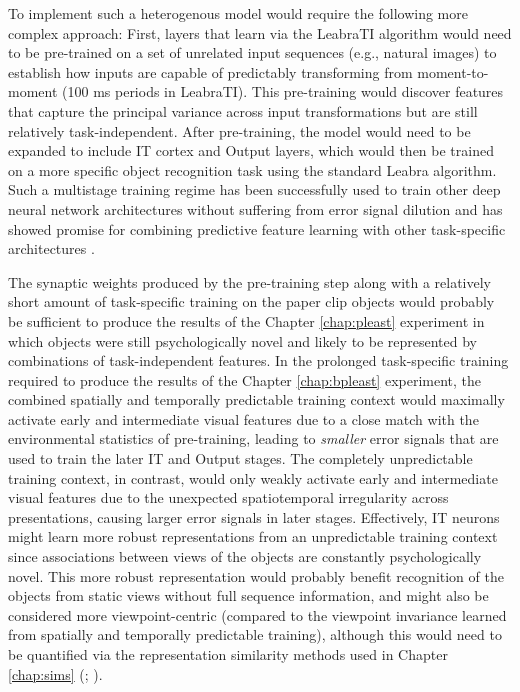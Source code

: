 \documentclass[dwyatte_dissertation.tex]{subfiles}
\begin{document}
To implement such a heterogenous model would require the following more complex approach: First, layers that learn via the LeabraTI algorithm would need to be pre-trained on a set of unrelated input sequences (e.g., natural images) to establish how inputs are capable of predictably transforming from moment-to-moment (100 ms periods in LeabraTI). This pre-training would discover features that capture the principal variance across input transformations but are still relatively task-independent. After pre-training, the model would need to be expanded to include IT cortex and Output layers, which would then be trained on a more specific object recognition task using the standard Leabra algorithm.  %
Such a multistage training regime has been successfully used to train other deep neural network architectures without suffering from error signal dilution \cite{HintonSalakhutdinov06} and has showed promise for combining predictive feature learning with other task-specific architectures  \cite{OReillyWyatteRohrlichEtAlInPrep}.

The synaptic weights produced by the pre-training step along with a relatively short amount of task-specific training on the paper clip objects would probably be sufficient to produce the results of the Chapter \ref{chap:pleast} experiment in which objects were still psychologically novel and likely to be represented by combinations of task-independent features. In the prolonged task-specific training required to produce the results of the Chapter \ref{chap:bpleast} experiment, the combined spatially and temporally predictable training context would maximally activate early and intermediate visual features due to a close match with the environmental statistics of pre-training, leading to \textit{smaller} error signals that are used to train the later IT and Output stages. The completely unpredictable training context, in contrast, would only weakly activate early and intermediate visual features due to the unexpected spatiotemporal irregularity across presentations, causing larger error signals in later stages. Effectively, IT neurons might learn more robust representations from an unpredictable training context since associations between views of the objects are constantly psychologically novel. This more robust representation would probably benefit recognition of the objects from static views without full sequence information, and might also be considered more viewpoint-centric (compared to the viewpoint invariance learned from spatially and temporally predictable training), although this would need to be quantified via the representation similarity methods used in Chapter \ref{chap:sims} (; ).
\end{document}
